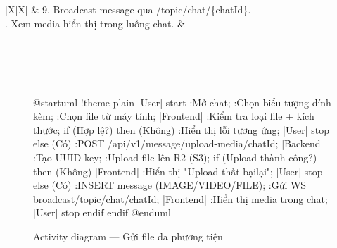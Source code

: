 \documentclass[12pt,a4paper]{report}
\begin{document}
\begin{xltabular}{\textwidth}{|X|X|}
\hline
& 9. Broadcast message qua /topic/chat/\{chatId\}. \\
. Xem media hiển thị trong luồng chat. & \\
\hline
{} \\
\hline
{} \\
\hline
{} \\
\hline
{} \\
\hline
\caption{Mô tả chức năng UC08}
\end{xltabular}
\renewcommand{\arraystretch}{1}

\begin{figure}[H]
    \centering
    \begin{plantuml}
        @startuml
        !theme plain
        |User|
        start
        :Mở chat;
        :Chọn biểu tượng đính kèm;
        :Chọn file từ máy tính;
        |Frontend|
        :Kiểm tra loại file + kích thước;
        if (Hợp lệ?) then (Không)
          :Hiển thị lỗi tương ứng;
          |User|
          stop
        else (Có)
          :POST /api/v1/message/upload-media/{chatId};
          |Backend|
          :Tạo UUID key;
          :Upload file lên R2 (S3);
          if (Upload thành công?) then (Không)
            |Frontend|
            :Hiển thị "Upload thất bại lại";
            |User|
            stop
          else (Có)
            :INSERT message (IMAGE/VIDEO/FILE);
            :Gửi WS broadcast\n/topic/chat/{chatId};
            |Frontend|
            :Hiển thị media trong chat;
            |User|
            stop
          endif
        endif
        @enduml
    \end{plantuml}
    \caption{Activity diagram --- Gửi file đa phương tiện}
\end{figure}
\end{document}
